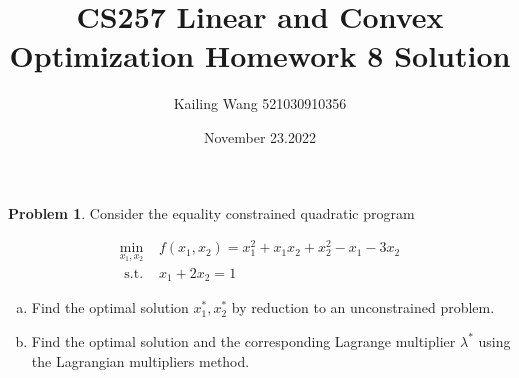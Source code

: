\documentclass{article}
\theoremstyle{definition}
\newtheorem{prob}{Problem}
\begin{document}
	\title{CS257 Linear and Convex Optimization Homework 8 Solution}
	\author{Kailing Wang 521030910356}
	\date{November 23.2022}
	\maketitle
	\begin{prob}
	Consider the equality constrained quadratic program
	
	$$
	\begin{array}{rl}
	\underset{x_{1}, x_{2}}{\min} & f\left(x_{1}, x_{2}\right)=x_{1}^{2}+x_{1} x_{2}+x_{2}^{2}-x_{1}-3 x_{2} \\
	\text { s.t. } & x_{1}+2 x_{2}=1
	\end{array}
	$$
	
	\begin{enumerate}[(a)]
		\item  Find the optimal solution $x_{1}^{*}, x_{2}^{*}$ by reduction to an unconstrained problem.
		\item Find the optimal solution and the corresponding Lagrange multiplier $\lambda^{*}$ using the Lagrangian multipliers method.
	\end{enumerate}
	\end{prob}
	
\end{document}
